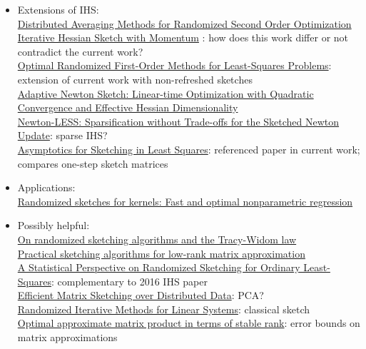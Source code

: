 \documentclass[10pt]{article}
\begin{document}
\begin{itemize}

\item
Extensions of IHS: \\
\href{https://arxiv.org/pdf/2002.06540.pdf}{Distributed Averaging Methods for Randomized Second Order Optimization} \\
\href{https://ieeexplore.ieee.org/document/8682720}{Iterative Hessian Sketch with Momentum} \todo: how does this work differ or not contradict the current work? \\
\href{https://proceedings.mlr.press/v119/lacotte20a/lacotte20a.pdf}{Optimal Randomized First-Order Methods for Least-Squares Problems}: extension of current work with non-refreshed sketches \\
\href{https://arxiv.org/pdf/2105.07291.pdf}{Adaptive Newton Sketch: Linear-time Optimization with Quadratic Convergence and Effective Hessian Dimensionality} \\
\href{https://arxiv.org/pdf/2107.07480.pdf}{Newton-LESS: Sparsification without Trade-offs for the Sketched Newton Update}: sparse IHS? \\
\href{https://proceedings.neurips.cc/paper/2019/file/1f36c15d6a3d18d52e8d493bc8187cb9-Paper.pdf}{Asymptotics for Sketching in Least Squares}: referenced paper in current work; compares one-step sketch matrices

\item
Applications: \\
\href{https://projecteuclid.org/journals/annals-of-statistics/volume-45/issue-3/Randomized-sketches-for-kernels-Fast-and-optimal-nonparametric-regression/10.1214/16-AOS1472.full}{Randomized sketches for kernels: Fast and optimal nonparametric regression}

\item
Possibly helpful: \\
\href{https://arxiv.org/pdf/2201.00450.pdf}{On randomized sketching algorithms and the Tracy-Widom law} \\
\href{https://arxiv.org/pdf/1609.00048.pdf}{Practical sketching algorithms for low-rank matrix approximation} \\
\href{https://www.jmlr.org/papers/volume17/15-440/15-440.pdf}{A Statistical Perspective on Randomized Sketching for Ordinary Least-Squares}: complementary to 2016 IHS paper \\
\href{https://dl.acm.org/doi/10.1145/3034786.3056119}{Efficient Matrix Sketching over Distributed Data}: PCA? \\
\href{https://epubs.siam.org/doi/pdf/10.1137/15M1025487}{Randomized Iterative Methods for Linear Systems}: classical sketch \\
\href{https://arxiv.org/pdf/1507.02268.pdf}{Optimal approximate matrix product in terms of stable rank}: error bounds on matrix approximations


\end{itemize}
\end{document}
